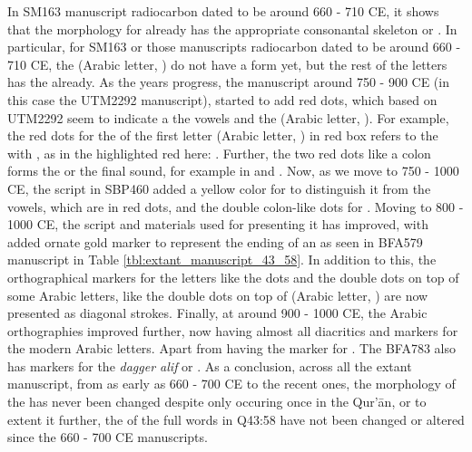 In SM163 manuscript radiocarbon dated to be around 660 - 710 CE, it shows that the morphology for   already has the appropriate consonantal skeleton or  . In particular, for SM163 or those manuscripts radiocarbon dated to be around 660 - 710 CE, the   (Arabic letter, ) do not have a form yet, but the rest of the letters has the   already. As the years progress, the manuscript around 750 - 900 CE (in this case the UTM2292 manuscript), started to add red dots, which based on UTM2292 seem to indicate a the vowels and the   (Arabic letter, ). For example, the red dots for the   of the first letter   (Arabic letter, ) in red box refers to the   with  , as in the highlighted red here:  . Further, the two red dots like a colon forms the   or the final   sound, for example in   and  . Now, as we move to 750 - 1000 CE, the script in SBP460 added a yellow color for   to distinguish it from the vowels, which are in red dots, and the double colon-like dots for  . Moving to 800 - 1000 CE, the script and materials used for presenting it has improved, with added ornate gold marker to represent the ending of an   as seen in BFA579 manuscript in Table \ref{tbl:extant_manuscript_43_58}. In addition to this, the orthographical markers for the letters like the dots and the double dots on top of some Arabic letters, like the double dots on top of   (Arabic letter, ) are now presented as diagonal strokes. Finally, at around 900 - 1000 CE, the Arabic orthographies improved further, now having almost all diacritics and markers for the modern Arabic letters. Apart from having the marker for  . The BFA783 also has markers for the \textit{dagger alif} or  . As a conclusion, across all the extant manuscript, from as early as 660 - 700 CE to the recent ones, the morphology of the   has never been changed despite only occuring once in the Qur'\=an, or to extent it further, the   of the full words in Q43:58 have not been changed or altered since the 660 - 700 CE manuscripts.

